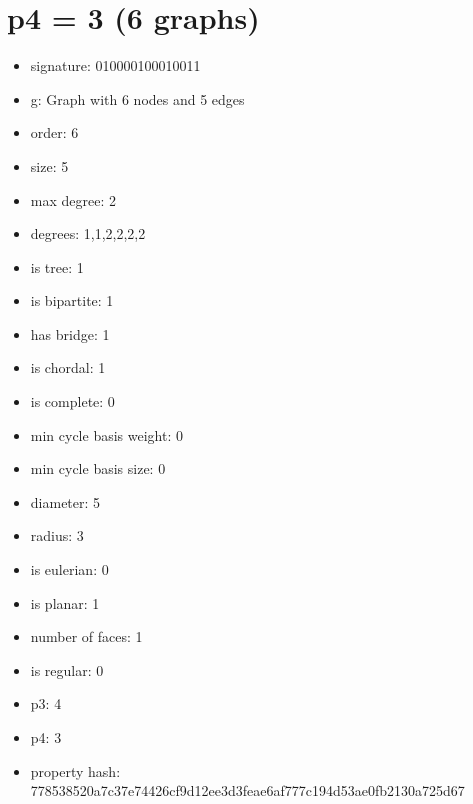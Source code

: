 \chapter{p4 = 3 (6 graphs)}
\newpage\begin{figure}
\end{figure}
\begin{itemize}
\item signature: 010000100010011
\item g: Graph with 6 nodes and 5 edges
\item order: 6
\item size: 5
\item max degree: 2
\item degrees: 1,1,2,2,2,2
\item is tree: 1
\item is bipartite: 1
\item has bridge: 1
\item is chordal: 1
\item is complete: 0
\item min cycle basis weight: 0
\item min cycle basis size: 0
\item diameter: 5
\item radius: 3
\item is eulerian: 0
\item is planar: 1
\item number of faces: 1
\item is regular: 0
\item p3: 4
\item p4: 3
\item property hash: 778538520a7c37e74426cf9d12ee3d3feae6af777c194d53ae0fb2130a725d67
\end{itemize}
\newpage
\begin{figure}
\end{figure}
